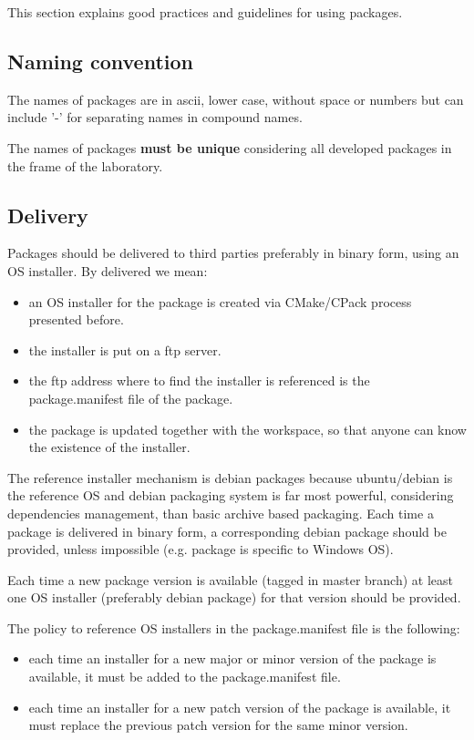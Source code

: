 \documentclass[12pt,a4paper]{article}
\begin{document}
This section explains good practices and guidelines for using packages.

\subsection{Naming convention}

The names of packages are in ascii, lower case, without space or numbers but can include '-' for separating names in compound names.

The names of packages \textbf{must be unique} considering all developed packages in the frame of the laboratory.

\subsection{Delivery}

Packages should be delivered to third parties preferably in binary form, using an OS installer. By delivered we mean:
\begin{itemize}
\item an OS installer for the package is created via CMake/CPack process presented before.
\item the installer is put on a ftp server.
\item the ftp address where to find the installer is referenced is the package.manifest file of the package.
\item the package is updated together with the workspace, so that anyone can know the existence of the installer.
\end{itemize}

The reference installer mechanism is debian packages because ubuntu/debian is the reference OS and debian packaging system is far most powerful, considering dependencies management, than basic archive based packaging. Each time a package is delivered in binary form, a corresponding debian package should be provided, unless impossible (e.g. package is specific to Windows OS).

Each time a new package version is available (tagged in master branch) at least one OS installer (preferably debian package) for that version should be provided.

The policy to reference OS installers in the package.manifest file is the following:
\begin{itemize}
\item each time an installer for a new major or minor version of the package is available, it must be added to the package.manifest file.
\item each time an installer for a new patch version of the package is available, it must replace the previous patch version for the same minor version.
\end{itemize}
\end{document}
